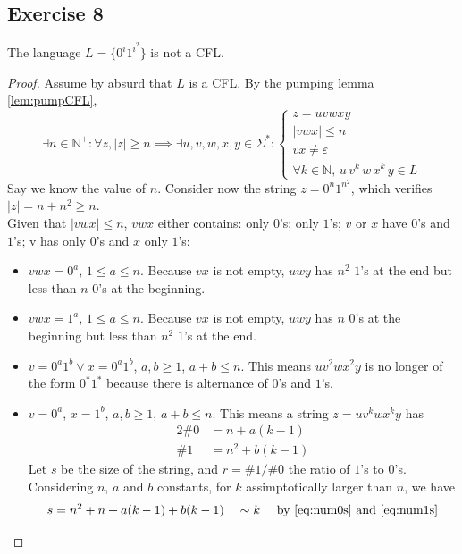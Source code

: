 {\subsection{Exercise 8}
\begin{theorem}
The language $L=\{0^i1^{i^2}\}$ is not a CFL.
\end{theorem}
\begin{proof}
Assume by absurd that $L$ is a CFL. By the pumping lemma \eqref{lem:pumpCFL},
\begin{equation*}
	\exists n \in \mathbb{N}^+ \colon \forall z, |z|\geq n \implies \exists u, v, w, x, y \in \Sigma^* \colon 
	\begin{cases}
		z=uvwxy\\
		|vwx| \leq n\\
		vx \neq \varepsilon \\
		\forall k \in \mathbb{N},\,u\,v^k\,w\,x^k\,y \in L
	\end{cases}
\end{equation*}
Say we know the value of $n$. Consider now the string $z=0^n1^{n^2}$, which verifies $|z|=n+n^2 \geq n$. \\
Given that $|vwx|\leq n$, $vwx$ either contains: only $0$'s; only $1$'s; $v$ or $x$ have $0$'s and $1$'s; v has only $0$'s and $x$ only $1$'s:
\begin{itemize}
	\item $vwx=0^a$, $1 \leq a \leq n$. Because $vx$ is not empty, $uwy$ has $n^2$ $1$'s at the end but less than $n$ $0$'s at the beginning.
	\item $vwx=1^a$, $1 \leq a \leq n$. Because $vx$ is not empty, $uwy$ has $n$ $0$'s at the beginning but less than $n^2$ $1$'s at the end.
	\item $v=0^a1^b \vee x=0^a1^b$, $a,b \geq 1$, $a+b \leq n$. This means $uv^2wx^2y$ is no longer of the form $0^*1^*$ because there is alternance of $0$'s and $1$'s.
	\item $v=0^a$, $x=1^b$, $a,b \geq 1$, $a+b \leq n$. This means a string $z=uv^kwx^ky$ has
	\begin{alignat}{2}
		\label{eq:num0s} \# 0 &= n+a(k-1)\\
		\label{eq:num1s} \# 1 &= n^2+b(k-1)
	\end{alignat}
	Let $s$ be the size of the string, and $r=\#1/\#0$ the ratio of $1$'s to $0$'s. Considering $n$, $a$ and $b$ constants, for $k$ assimptotically larger than $n$, we have
	\begin{alignat}{3}
		\label{eq:sizerel0} s &= n^2+n+a(k-1)+b(k-1)         &&\sim k        &&\text{ by \eqref{eq:num0s} and \eqref{eq:num1s}} \\

\end{alignat}
\end{itemize}
\end{proof}}
